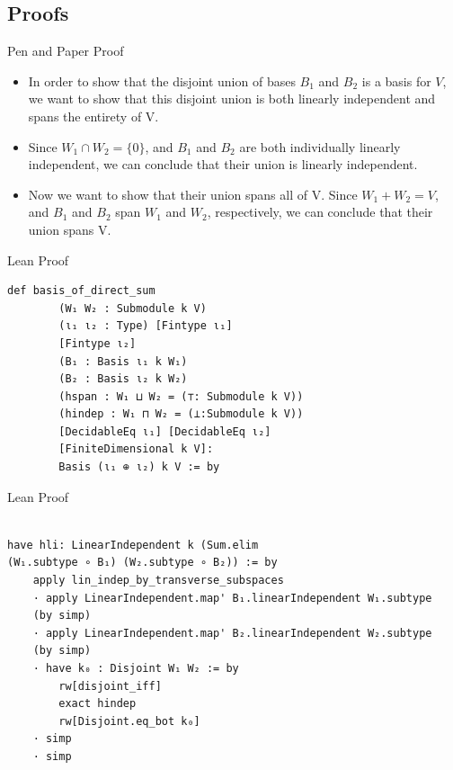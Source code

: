 \documentclass[svgnames]{beamer}
\begin{document}
\subsection{Proofs}
\begin{frame}[label={sec:proof_comparison}]{Pen and Paper Proof}
 \begin{itemize}[<+->]
\item In order to show that the disjoint union of bases $B_1$ and $B_2$ is a basis for $V$, we want to show that this disjoint union is both linearly independent and spans the entirety of V. 
\item Since $W_1 \cap W_2 = \{0\}$, and $B_1$ and $B_2$ are both individually linearly independent, we can conclude that their union is linearly independent.
\item Now we want to show that their union spans all of V. Since $W_1 + W_2 = V$, and $B_1$ and $B_2$ span $W_1$ and $W_2$, respectively, we can conclude that their union spans V. 
\end{itemize}
\end{frame}

\begin{frame}[label={sec_proof_comparison},fragile]{Lean Proof}

{\scriptsize
\begin{verbatim}
def basis_of_direct_sum
        (W₁ W₂ : Submodule k V)
        (ι₁ ι₂ : Type) [Fintype ι₁] 
        [Fintype ι₂]
        (B₁ : Basis ι₁ k W₁)
        (B₂ : Basis ι₂ k W₂)
        (hspan : W₁ ⊔ W₂ = (⊤: Submodule k V))
        (hindep : W₁ ⊓ W₂ = (⊥:Submodule k V))
        [DecidableEq ι₁] [DecidableEq ι₂] 
        [FiniteDimensional k V]:
        Basis (ι₁ ⊕ ι₂) k V := by
\end{verbatim}
}

\end{frame}

\begin{frame}[label={sec_proof_comparison},fragile]{Lean Proof}

{\scriptsize
\begin{verbatim}

have hli: LinearIndependent k (Sum.elim 
(W₁.subtype ∘ B₁) (W₂.subtype ∘ B₂)) := by
    apply lin_indep_by_transverse_subspaces
    · apply LinearIndependent.map' B₁.linearIndependent W₁.subtype 
    (by simp)
    · apply LinearIndependent.map' B₂.linearIndependent W₂.subtype 
    (by simp)
    · have k₀ : Disjoint W₁ W₂ := by
        rw[disjoint_iff]
        exact hindep
        rw[Disjoint.eq_bot k₀]
    · simp
    · simp
\end{verbatim}
}

\end{frame}
\end{document}
